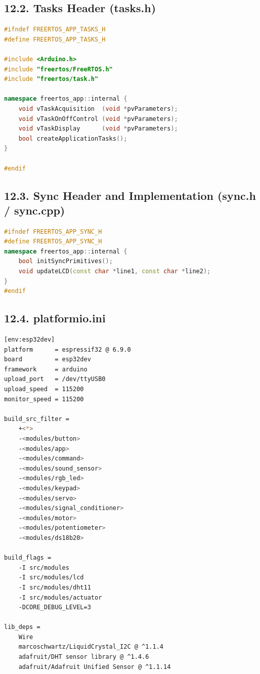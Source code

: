 \documentclass[12pt]{article}
\begin{document}
\subsection*{12.2. Tasks Header (tasks.h)}

\begin{lstlisting}[language=C++, caption=tasks.h -- Task Declarations]
#ifndef FREERTOS_APP_TASKS_H
#define FREERTOS_APP_TASKS_H

#include <Arduino.h>
#include "freertos/FreeRTOS.h"
#include "freertos/task.h"

namespace freertos_app::internal {
    void vTaskAcquisition  (void *pvParameters);
    void vTaskOnOffControl (void *pvParameters);
    void vTaskDisplay      (void *pvParameters);
    bool createApplicationTasks();
}

#endif
\end{lstlisting}

\subsection*{12.3. Sync Header and Implementation (sync.h / sync.cpp)}

\begin{lstlisting}[language=C++, caption=sync.h]
#ifndef FREERTOS_APP_SYNC_H
#define FREERTOS_APP_SYNC_H
namespace freertos_app::internal {
    bool initSyncPrimitives();
    void updateLCD(const char *line1, const char *line2);
}
#endif
\end{lstlisting}

\subsection*{12.4. platformio.ini}

\begin{lstlisting}[language=bash, caption=platformio.ini -- Build Configuration]
[env:esp32dev]
platform      = espressif32 @ 6.9.0
board         = esp32dev
framework     = arduino
upload_port   = /dev/ttyUSB0
upload_speed  = 115200
monitor_speed = 115200

build_src_filter =
    +<*>
    -<modules/button>
    -<modules/app>
    -<modules/command>
    -<modules/sound_sensor>
    -<modules/rgb_led>
    -<modules/keypad>
    -<modules/servo>
    -<modules/signal_conditioner>
    -<modules/motor>
    -<modules/potentiometer>
    -<modules/ds18b20>

build_flags =
    -I src/modules
    -I src/modules/lcd
    -I src/modules/dht11
    -I src/modules/actuator
    -DCORE_DEBUG_LEVEL=3

lib_deps =
    Wire
    marcoschwartz/LiquidCrystal_I2C @ ^1.1.4
    adafruit/DHT sensor library @ ^1.4.6
    adafruit/Adafruit Unified Sensor @ ^1.1.14
\end{lstlisting}
\end{document}
